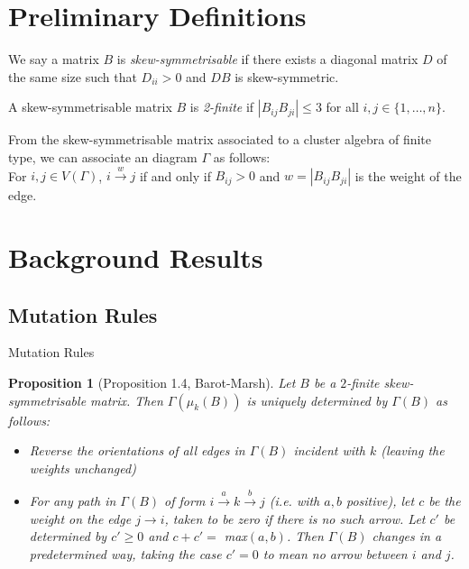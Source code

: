 \documentclass{beamer}
\newtheorem{proposition}{Proposition}
\begin{document}
\section{Preliminary Definitions}

\begin{frame}
\begin{definition}
We say a matrix $B$ is \textit{skew-symmetrisable} if there exists a diagonal matrix $D$ of the same size such that $D_{ii}>0$ and $DB$ is skew-symmetric.
\end{definition}

\pause

\begin{definition}
A skew-symmetrisable matrix $B$ is \textit{2-finite} if $|B_{ij}B_{ji}| \leq 3$ for all $i, j \in \{ 1, \ldots, n \}$.
\end{definition}

\pause

From the skew-symmetrisable matrix associated to a cluster algebra of finite type, we can associate an diagram $\Gamma$ as follows:\\


For $i, j \in V(\Gamma)$, $i \xrightarrow{w} j$ if and only if $B_{ij}>0$ and $w = |B_{ij}B_{ji}|$ is the weight of the edge.

\end{frame}


\section{Background Results}

\subsection{Mutation Rules}

\begin{frame}{Mutation Rules}
\begin{proposition}
[Proposition 1.4, Barot-Marsh]
Let $B$ be a $2$-finite skew-symmetrisable matrix. Then $\Gamma(\mu_k(B))$ is uniquely determined by $\Gamma(B)$ as follows:
\begin{itemize}
\item Reverse the orientations of all edges in $\Gamma(B)$ incident with $k$ (leaving the weights unchanged)
\item For any path in $\Gamma(B)$ of form $i \xrightarrow{a} k \xrightarrow{b} j$ (i.e. with $a,b$ positive), let $c$ be the weight on the edge $j \rightarrow i$, taken to be zero if there is no such arrow. Let $c'$ be determined by $c'\geq 0$ and 
$c+c' =$ max$(a,b)$. 
Then $\Gamma(B)$ changes in a predetermined way, taking the case $c' = 0$ to mean no arrow between $i$ and $j$.

\end{itemize}
\end{proposition}

\end{frame}
\end{document}
